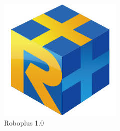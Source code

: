 \begin{figure}
    \includegraphics[width=0.9\linewidth]{chapter3/images/roboplus/roboplus.jpg} 
    \caption*{Roboplus 1.0}
\end{figure}

